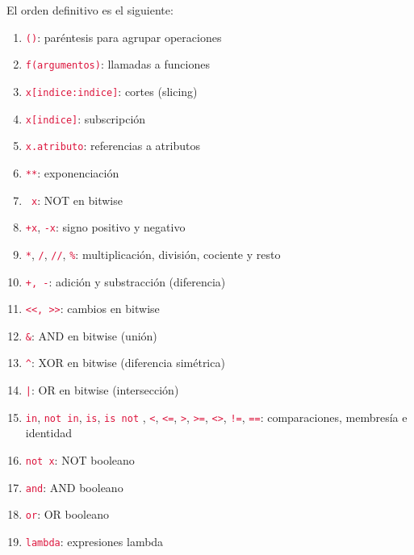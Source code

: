 \documentclass{report}
\newcommand{\ttt}[1]{\textcolor{Crimson}{\texttt{#1}}}
\begin{document}
El orden definitivo es el siguiente:

\begin{enumerate}
  \item \ttt{()}: paréntesis para agrupar operaciones
  
  \item \ttt{f(argumentos)}: llamadas a funciones
  
  \item \ttt{x[indice:indice]}: cortes (slicing)
  
  \item \ttt{x[indice]}: subscripción
  
  \item \ttt{x.atributo}: referencias a atributos
  
  \item \ttt{**}: exponenciación
  
  \item \ttt{~x}: NOT en bitwise
  
  \item \ttt{+x}, \ttt{-x}: signo positivo y negativo
  
  \item \ttt{*}, \ttt{/}, \ttt{//}, \ttt{\%}: multiplicación, división, cociente y resto
  
  \item \ttt{+, -}: adición y substracción (diferencia)
  
  \item \ttt{<<, >>}: cambios en bitwise
  
  \item \ttt{\&}: AND en bitwise (unión)
  
  \item \ttt{\^}: XOR en bitwise (diferencia simétrica)
  
  \item \ttt{|}: OR en bitwise (intersección)
  
  \item \ttt{in}, \ttt{not in}, \ttt{is}, \ttt{is not} , \ttt{<}, \ttt{<=}, \ttt{>}, \ttt{>=}, \ttt{<>}, \ttt{!=}, \ttt{==}: comparaciones, membresía e identidad
  
  \item \ttt{not x}: NOT booleano
  
  \item \ttt{and}: AND booleano
  
  \item \ttt{or}: OR booleano
  
  \item \ttt{lambda}: expresiones lambda

\end{enumerate}
\end{document}
